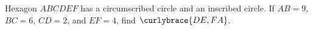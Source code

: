 Hexagon $ABCDEF$ has a circumscribed circle and an inscribed circle. If $AB=9$, $BC=6$, $CD=2$, and $EF=4$, find $\curlybrace{DE,FA}$.